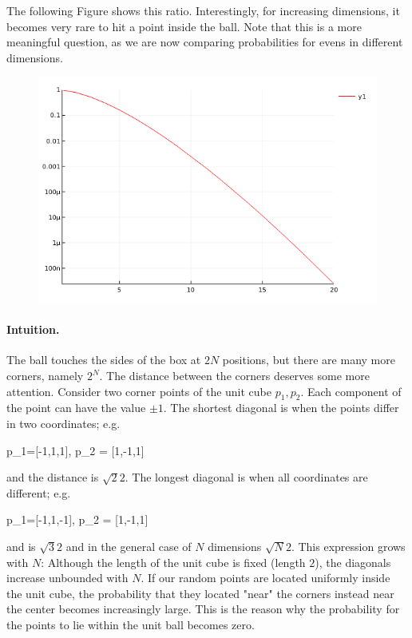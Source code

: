\bee
{}
\eee

The following Figure shows this ratio. Interestingly, for increasing dimensions, it becomes very rare to hit a point inside the ball. Note that this is a more meaningful question, as we are now comparing probabilities for evens in different dimensions.

\begin{figure}[H]
	\includegraphics[scale=0.7]{images/high_dim_02_01.png}
\end{figure}

\paragraph{Intuition.} The ball touches the sides of the box at $2N$ positions, but there are many more corners, namely $2^N$. The distance between the corners deserves some more attention. Consider two corner points of the unit cube $p_1, p_2$. Each component of the point can have the value $\pm 1$. The shortest diagonal is when the points differ in two coordinates; e.g.

\bee
p_1=[-1,1,1], \quad p_2 = [1,-1,1]
\eee

and the distance is $\sqrt{2}2$. The longest diagonal is when all coordinates are different; e.g.

\bee
p_1=[-1,1,-1], \quad p_2 = [1,-1,1]
\eee

and is $\sqrt{3}2$ and in the general case of $N$ dimensions $\sqrt{N}2$. This expression grows with $N$: Although the length of the unit cube is fixed (length $2$), the diagonals increase unbounded with $N$. If our random points are located uniformly inside the unit cube, the probability that they located "near" the corners instead near the center becomes increasingly large. This is the reason why the probability for the points to lie within the unit ball becomes zero.


